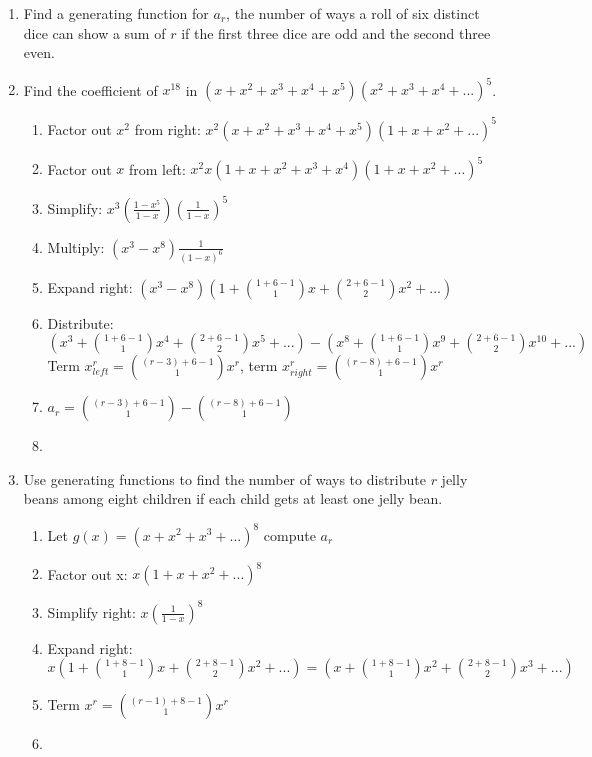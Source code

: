 \documentclass[12pt]{amsart}
\begin{document}
\begin{enumerate}
\item Find a generating function for $a_r$, the number of ways a roll of six distinct dice can show a sum of $r$ if the first three dice are odd and the second three even.

    \item Find the coefficient of $x^{18}$ in $(x+x^2+x^3+x^4+x^5)(x^2+x^3+x^4+...)^5$.
    \begin{enumerate}
        \item Factor out $x^2$ from right: $x^2(x+x^2+x^3+x^4+x^5)(1+x+x^2+...)^5$
        \item Factor out $x$ from left: $x^2x(1+x+x^2+x^3+x^4)(1+x+x^2+...)^5$
        \item Simplify: $x^3(\frac{1-x^5}{1-x})(\frac{1}{1-x})^5$
        \item Multiply: $(x^3-x^8)\frac{1}{(1-x)^6}$
        \item Expand right: $(x^3-x^8)(1+\binom{1+6-1}{1}x+\binom{2+6-1}{2}x^2+...)$
        \item Distribute: $(x^3+\binom{1+6-1}{1}x^4+\binom{2+6-1}{2}x^5+...)-(x^8+\binom{1+6-1}{1}x^9+\binom{2+6-1}{2}x^10+...)$ Term $x^r_{left}=\binom{(r-3)+6-1}{1}x^r$, term $x^r_{right}=\binom{(r-8)+6-1}{1}x^r$
        \item $a_r=\binom{(r-3)+6-1}{1}-\binom{(r-8)+6-1}{1}$
        \item {}
    \end{enumerate}

\newpage
{}
\item Use generating functions to find the number of ways to distribute $r$ jelly beans among eight children if each child gets at least one jelly bean.
\begin{enumerate}
    \item Let $g(x)=(x+x^2+x^3+...)^8$ compute $a_r$
    \item Factor out x: $x(1+x+x^2+...)^8$
    \item Simplify right: $x(\frac{1}{1-x})^8$
    \item Expand right: $x(1+\binom{1+8-1}{1}x+\binom{2+8-1}{2}x^2+...)=(x+\binom{1+8-1}{1}x^2+\binom{2+8-1}{2}x^3+...)$
    \item Term $x^r=\binom{(r-1)+8-1}{1}x^r$
    \item {}
\end{enumerate}

    
    
\end{enumerate}
\end{document}
